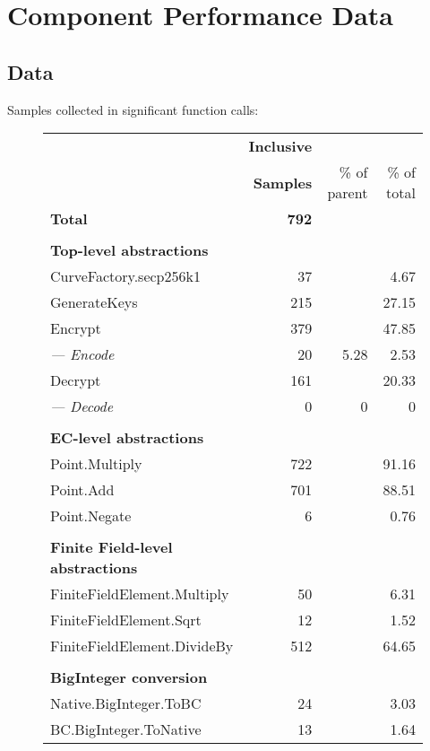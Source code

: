 \section{Component Performance Data}
\label{app:component-performance-data}

\subsection{Data}

Samples collected in significant function calls:

\begin{figure}[h!]
\begin{tabular}{|l|r|r|r|}
	\hline
	& \textbf{Inclusive} && \\
	& \textbf{Samples} & \% of parent & \% of total \\
	\hline
	\textbf{Total} & \textbf{792} && \\
	\hline
	&&& \\
	\textbf{Top-level abstractions} &&& \\
	CurveFactory.secp256k1 & 37 && 4.67 \\
	GenerateKeys & 215 && 27.15 \\
	Encrypt & 379 && 47.85 \\
	\emph{--- Encode} & 20 & 5.28 & 2.53 \\
	Decrypt & 161 && 20.33 \\
	\emph{--- Decode} & 0 & 0 & 0 \\
	\hline
	&&& \\
	\textbf{EC-level abstractions} &&& \\
	Point.Multiply & 722 && 91.16 \\
	Point.Add & 701 && 88.51 \\
	Point.Negate & 6 && 0.76 \\
	\hline
	&&& \\
	\textbf{Finite Field-level abstractions} &&& \\
	FiniteFieldElement.Multiply & 50 && 6.31 \\
	FiniteFieldElement.Sqrt & 12 && 1.52 \\
	FiniteFieldElement.DivideBy & 512 && 64.65 \\
	\hline
	&&& \\
	\textbf{BigInteger conversion} &&& \\
	Native.BigInteger.ToBC & 24 && 3.03 \\
	BC.BigInteger.ToNative & 13 && 1.64 \\
	\hline
\end{tabular}
\end{figure}

